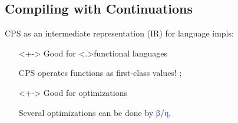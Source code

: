 \subsection{Compiling with Continuations}
\begin{frame}[fragile]
	\frametitlesubs

	CPS as \textcolor{subhighlight}{an intermediate representation} (IR) for language impls\cite{appel1992cwc}:

	\begin{center}
	\end{center}

	\pause
	\begin{itemize}
		\item[\emoji{check-mark-button}]<+->
		      Good for {\only<.>{\color{subhighlight}}functional languages}

		      \smaller
		      CPS operates functions as first-class values!
		      ;

		\item[\emoji{check-mark-button}]<+->
		      Good for \textcolor{subhighlight}{optimizations}

		      \smaller
		      Several optimizations can be done by \textcolor{highlight}{β}/\textcolor{highlight}{η},


\end{itemize}
\end{frame}
